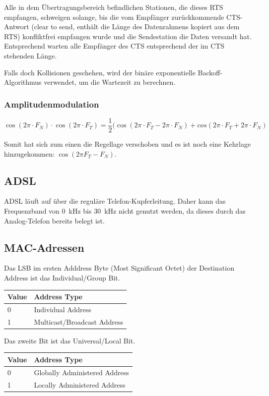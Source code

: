 Alle in dem Übertragungsbereich befindlichen Stationen, die dieses RTS
empfangen, schweigen solange, bis die vom Empfänger zurückkommende CTS-Antwort
(clear to send, enthält die Länge des Datenrahmens kopiert aus dem RTS)
konfliktfrei empfangen wurde und die Sendestation die Daten versandt hat.
Entsprechend warten alle Empfänger des CTS entsprechend der im CTS stehenden
Länge.

Falls doch Kollisionen geschehen, wird der binäre exponentielle
Backoff-Algorithmus verwendet, um die Wartezeit zu berechnen.

\subsubsection{Amplitudenmodulation}

\[
	\cos (2\pi \cdot F_N) \cdot \cos (2\pi \cdot F_T)
	= \frac{1}{2}(\cos (2\pi \cdot F_T - 2\pi \cdot F_N)
	+ cos(2\pi \cdot F_T + 2\pi \cdot F_N)
\]

Somit hat sich zum einen die Regellage verschoben und es ist noch eine Kehrlage
hinzugekommen: $\cos (2\pi F_T - F_N)$.


\subsection{ADSL}

ADSL läuft auf über die reguläre Telefon-Kupferleitung. Daher kann das
Frequenzband von 0~kHz bis 30~kHz nicht genutzt werden, da dieses durch das
Analog-Telefon bereits belegt ist.


\subsection{MAC-Adressen}

Das LSB im ersten Adddress Byte (Most Significant Octet) der Destination Address
ist das Individual/Group Bit.

\begin{tabular}[h]{|l|l|}
	\hline
  \textbf{Value} & \textbf{Address Type} \\
	\hline
  0 & Individual Address \\
  1 & Multicast/Broadcast Address \\
	\hline
\end{tabular}

Das zweite Bit ist das Universal/Local Bit.

\begin{tabular}[h]{|l|l|}
	\hline
  \textbf{Value} & \textbf{Address Type} \\
	\hline
  0 & Globally Administered Address \\
  1 & Locally Administered Address \\
	\hline
\end{tabular}
